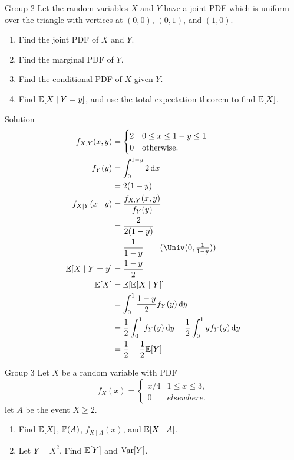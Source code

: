 \documentclass{article}
\begin{document}
\begin{problem}
    {Group 2}
    Let the random variables $X$ and $Y$ have a joint PDF which is uniform over the triangle with vertices at $(0, 0)$, $(0, 1)$, and $(1, 0)$.
    \begin{enumerate}
        \item Find the joint PDF of $X$ and $Y$.
        \item Find the marginal PDF of $Y$.
        \item Find the conditional PDF of $X$ given $Y$.
        \item Find $\condE{X}{Y = y}$, and use the total expectation theorem to find $\E{X}$.
    \end{enumerate}
\end{problem}

\begin{solution}
    {Solution}
    \begin{align*}
        f_{X,Y}(x,y) &= {
            \begin{cases}
                2 & 0 \leq x \leq 1-y \leq 1 \\
                0 & \text{otherwise.}
            \end{cases}
        } \\
        f_Y(y) &= \int_{0}^{1-y}2\diff x \\
        &= 2(1-y) \\
        f_{X\mid Y}(x\mid y) &= \frac{f_{X,Y}(x,y)}{f_Y(y)} \\
        &= \frac{2}{2(1-y)} \\
        &= \frac{1}{1-y} \tag{$\Univ(0,\frac{1}{1-y})$}\\
        \condE{X}{Y=y} &= \frac{1-y}{2} \\
        \E{X} &= \E{\condE{X}{Y}} \\
        &= \int_{0}^{1}\frac{1-y}{2}f_Y{(y)}\diff y \\
        &= \frac{1}{2}\int_{0}^{1}f_Y(y)\diff y - \frac{1}{2}\int_{0}^{1}yf_Y(y)\diff y\\
        &= \frac{1}{2}-\frac{1}{2}\E{Y} \\
    \end{align*}
\end{solution}

\begin{problem}
    {Group 3}
    Let $X$ be a random variable with PDF
    \[
        f_X(x) = {
            \begin{cases}
                x/4 & 1 \leq x \leq 3,\\
                0 & elsewhere.
            \end{cases}
        }
    \]
    let $A$ be the event ${X \geq 2}$.
    \begin{enumerate}
        \item Find $\E{X}$, $\P{A}$, $f_{X\mid A}(x)$, and $\E{X \mid A}$.
        \item Let $Y = X^2$. Find $\E{Y}$ and $\mathop{\mathrm{Var}}\nolimits[Y]$.
    \end{enumerate}
\end{problem}
\end{document}
